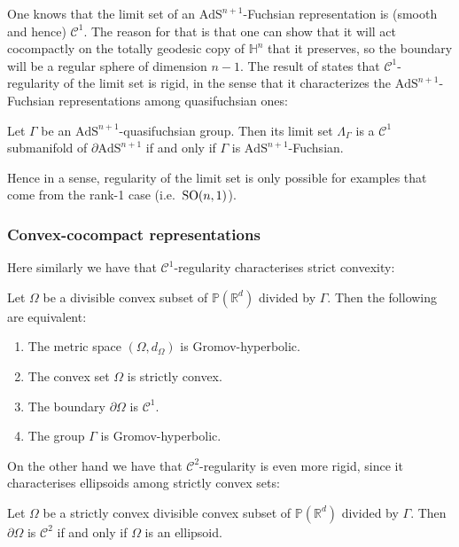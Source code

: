 \documentclass{report}
\begin{document}
One knows that the limit set of an $\mathrm{AdS}^{n+1}$-Fuchsian representation is (smooth and hence) $\mathcal C^1$.
The reason for that is that one can show that it will act cocompactly on the totally geodesic copy of $\mathbb H^n$ that it preserves, so the boundary will be a regular sphere of dimension $n-1$.
The result of \cite{glorieux2018regularity} states that $\mathcal C^1$-regularity of the limit set is rigid, in the sense that it characterizes the $\mathrm{AdS}^{n+1}$-Fuchsian representations among quasifuchsian ones:
\begin{theorem}
Let $\Gamma$ be an $\mathrm{AdS}^{n+1}$-quasifuchsian group.
Then its limit set $\Lambda_\Gamma$ is a $\mathcal C^1$ submanifold of $\partial \mathrm{AdS}^{n+1}$ if and only if $\Gamma$ is $\mathrm{AdS}^{n+1}$-Fuchsian.
\end{theorem}
Hence in a sense, regularity of the limit set is only possible for examples that come from the rank-1 case (i.e.\ $\operatorname{{\mathrm{SO}}}(n,1)$).

\subsubsection{Convex-cocompact representations}
Here similarly we have that $\mathcal C^1$-regularity characterises strict convexity:
\begin{theorem}
    Let $\Omega$ be a divisible convex subset of $\mathbb P(\mathbb R^d)$ divided by $\Gamma$.
    Then the following are equivalent:
    \begin{enumerate}
        \item The metric space $(\Omega, d_\Omega)$ is Gromov-hyperbolic.
        \item The convex set $\Omega$ is strictly convex.
        \item The boundary $\partial \Omega$ is $\mathcal C^1$.
        \item The group $\Gamma$ is Gromov-hyperbolic.
    \end{enumerate}
\end{theorem}
On the other hand we have that $\mathcal C^2$-regularity is even more rigid, since it characterises ellipsoids among strictly convex sets:
\begin{theorem}[Benoist ?]
    Let $\Omega$ be a strictly convex divisible convex subset of $\mathbb P(\mathbb R^d)$ divided by $\Gamma$.
    Then $\partial \Omega$ is $\mathcal C^2$ if and only if $\Omega$ is an ellipsoid.
\end{theorem}
\end{document}
